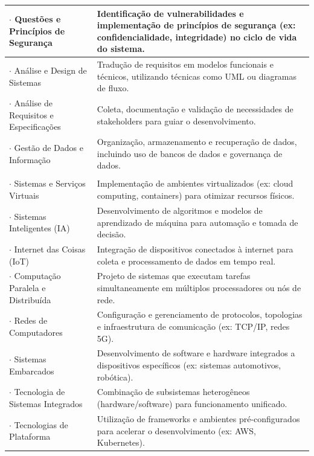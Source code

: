 \begin{table}[h]
\begin{tabular}{|m{5.5cm}|m{8.5cm}|}
    \hline
    \cellcolor{AzulMarca} $\cdot$ Questões e Princípios de Segurança & Identificação de vulnerabilidades e implementação de princípios de segurança (ex: confidencialidade, integridade) no ciclo de vida do sistema. \\
    \hline
    \cellcolor{AzulMarca} $\cdot$ Análise e Design de Sistemas & Tradução de requisitos em modelos funcionais e técnicos, utilizando técnicas como UML ou diagramas de fluxo. \\
    \hline
    $\cdot$ Análise de Requisitos e Especificações & Coleta, documentação e validação de necessidades de stakeholders para guiar o desenvolvimento. \\
    \hline
    \cellcolor{AzulMarca} $\cdot$ Gestão de Dados e Informação & Organização, armazenamento e recuperação de dados, incluindo uso de bancos de dados e governança de dados. \\
    \hline
    \rowcolor{AzulClaro} \multicolumn{2}{|l|}{\textcolor{white}{\textbf{3. Arquitetura e Infraestrutura de Sistemas}}} \\
    \hline
    $\cdot$ Sistemas e Serviços Virtuais & Implementação de ambientes virtualizados (ex: cloud computing, containers) para otimizar recursos físicos. \\
    \hline
    $\cdot$ Sistemas Inteligentes (IA) & Desenvolvimento de algoritmos e modelos de aprendizado de máquina para automação e tomada de decisão. \\
    \hline
    \cellcolor{AmareloVivo} $\cdot$ Internet das Coisas (IoT) & Integração de dispositivos conectados à internet para coleta e processamento de dados em tempo real. \\
    \hline
    \cellcolor{AmareloVivo} $\cdot$ Computação Paralela e Distribuída & Projeto de sistemas que executam tarefas simultaneamente em múltiplos processadores ou nós de rede. \\
    \hline
    $\cdot$ Redes de Computadores & Configuração e gerenciamento de protocolos, topologias e infraestrutura de comunicação (ex: TCP/IP, redes 5G). \\
    \hline
    \cellcolor{AmareloVivo} $\cdot$ Sistemas Embarcados & Desenvolvimento de software e hardware integrados a dispositivos específicos (ex: sistemas automotivos, robótica). \\
    \hline
    $\cdot$ Tecnologia de Sistemas Integrados & Combinação de subsistemas heterogêneos (hardware/software) para funcionamento unificado. \\
    \hline
    \cellcolor{AzulMarca} $\cdot$ Tecnologias de Plataforma & Utilização de frameworks e ambientes pré-configurados para acelerar o desenvolvimento (ex: AWS, Kubernetes). \\

\end{tabular}
\end{table}
